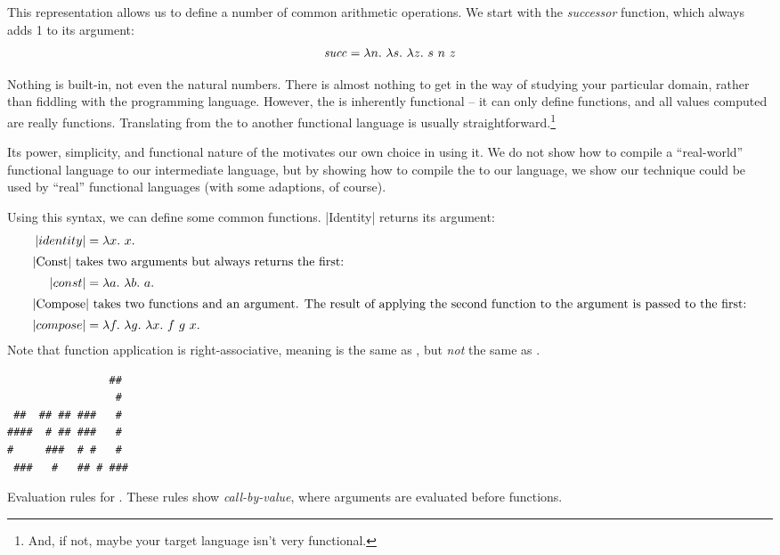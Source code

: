 \documentclass[12pt]{report}
\begin{document}
This representation allows
us to define a number of common arithmetic operations. We start 
with the \emph{successor} function, which always adds 1 to its
argument:
\begin{equation}
  \mathit{succ} = \lambda n.\ \lambda s.\ \lambda z.\ s\ n\ z
\end{equation}




Nothing is built-in,
not even the natural numbers. There is almost nothing to get in the
way of studying your particular domain, rather than fiddling with the
programming language. However, the \lamA is inherently functional --
it can only define functions, and all values computed are really
functions. Translating from the \lamA to another functional language
is usually straightforward.\footnote{And, if not, maybe your target
  language isn't very functional.}

Its power, simplicity, and functional nature of the \lamA motivates
our own choice in using it. We do not show how to compile a
``real-world'' functional language to our intermediate language, but
by showing how to compile the \lamA to our language, we show our
technique could be used by ``real'' functional languages (with some
adaptions, of course).

Using this syntax, we can define some common functions. |Identity|
returns its argument:
\begin{align}
  |identity| &= \lambda x.\ x. \label{eq_lang2} \\
  \intertext{|Const| takes two arguments but always returns the first:}
  |const| &= \lambda a.\ \lambda b.\ a. \label{eq_lang4} \\
  \intertext{|Compose| takes two functions and an argument. The result of
    applying the second function to the argument is passed to the first:}
  |compose| &= \lambda f.\ \lambda g.\ \lambda x.\ f\ g\ x. \label{eq_lang3} 
\end{align}
Note that function application is right-associative, meaning
 is the same as ,
but \emph{not} the same as .

\begin{myfig}[bt]
\begin{minipage}{2in}
\begin{Verbatim}
                ##  
                 #  
 ##  ## ## ###   #  
####  # ## ###   #  
#     ###  # #   #  
 ###   #   ## # ### 
\end{Verbatim}
\end{minipage}
  \caption{Evaluation rules for \lamA. These rules show 
    \emph{call-by-value}, where arguments are evaluated
    before functions.}
  \label{fig_lang2}
\end{myfig}
\end{document}
